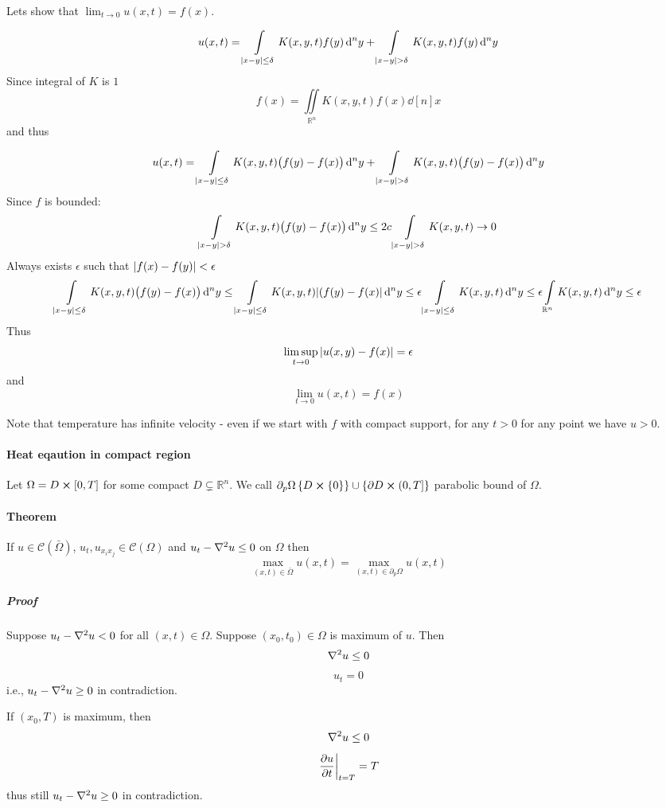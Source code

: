 Lets show that $\lim_{t\to0} u(x,t) = f(x)$.

$$u(x,t) = \int\limits_{\abs{x-y} \leq \delta} K(x,y,t) f(y) \dd[n]{y} + \int\limits_{\abs{x-y} > \delta} K(x,y,t) f(y) \dd[n]{y}$$
Since integral of $K$ is $1$
$$f(x) = \iint\limits_{\mathbb{R}^n} K(x,y,t) f(x) \dd[n]{x}$$
and thus

$$u(x,t) = \int\limits_{\abs{x-y} \leq \delta} K(x,y,t) \qty\big(f(y)-f(x)) \dd[n]{y} + \int\limits_{\abs{x-y} > \delta} K(x,y,t) \qty\big(f(y)-f(x)) \dd[n]{y}$$
Since $f$ is bounded:
$$\int\limits_{\abs{x-y} > \delta} K(x,y,t) \qty\big(f(y)-f(x)) \dd[n]{y} \leq 2c \int\limits_{\abs{x-y}> \delta} K(x,y,t)  \to 0 $$
Always exists $\epsilon$ such that $\abs{f(x)-f(y)} < \epsilon$ 
$$\int\limits_{\abs{x-y} \leq \delta} K(x,y,t) \qty\big(f(y)-f(x)) \dd[n]{y} \leq
\int\limits_{\abs{x-y} \leq \delta} K(x,y,t) \abs{(f(y)-f(x)} \dd[n]{y} \leq \epsilon\int\limits_{\abs{x-y} \leq \delta} K(x,y,t)  \dd[n]{y} \leq \epsilon\int\limits_{\mathbb{R}^n} K(x,y,t)  \dd[n]{y} \leq \epsilon $$
Thus
$$\limsup_{t\to 0} \abs{u(x,y) -f(x)} = \epsilon$$
and
$$\lim_{t\to0} u(x,t) = f(x)$$

Note that temperature has infinite velocity - even if we start with $f$ with compact support, for any $t>0$ for any point we have $u>0$.

\paragraph{Heat eqaution in compact region}
Let $\Omega = D \cross [0,T]$ for some compact $D \subsetneq \mathbb{R}^n$. We call $\partial_p \Omega \left\{ D \cross \left\{0 \right\} \right\} \cup \left\{ \partial D \cross (0,T] \right\}$ parabolic bound of $\Omega$.
\paragraph{Theorem}
If $u\in \mathcal{C} (\bar{\Omega})$, $u_t, u_{x_ix_j} \in \mathcal{C}(\Omega)$ and $u_t - \laplacian{u} \leq 0$ on $\Omega$ then
$$\max\limits_{(x,t)\in \bar{\Omega}} u(x,t) = \max\limits_{(x,t)\in \partial_p \Omega} u(x,t)$$
\subparagraph{Proof}
Suppose $u_t - \laplacian{u}<0$ for all $(x,t) \in \Omega$. Suppose $(x_0,t_0) \in \Omega$ is maximum of $u$. Then
$$\laplacian{u}\leq 0$$
$$u_t = 0$$
i.e., $u_t - \laplacian{u} \geq 0$ in contradiction.

If $(x_0, T)$ is maximum, then 
$$\laplacian{u}\leq 0$$
$$\eval{\pdv{u}{t}}_{t=T} = T$$
thus still $u_t - \laplacian{u} \geq 0$ in contradiction.


